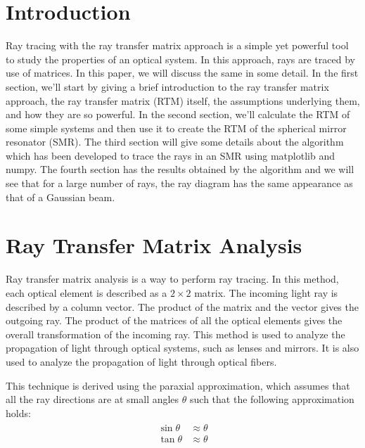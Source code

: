 \documentclass[12pt]{article}
\begin{document}
\section*{Introduction}
Ray tracing with the ray transfer matrix approach is a simple yet powerful tool to study the properties of an optical system. In this approach, rays are traced by use of matrices. In this paper, we will discuss the same in some detail. In the first section, we'll start by giving a brief introduction to the ray transfer matrix approach, the ray transfer matrix (RTM) itself, the assumptions underlying them, and how they are so powerful. In the second section, we'll calculate the RTM of some simple systems and then use it to create the RTM of the spherical mirror resonator (SMR). The third section will give some details about the algorithm which has been developed to trace the rays in an SMR using {\color{cyan}matplotlib} and {\color{cyan}numpy}. The fourth section has the results obtained by the algorithm and we will see that for a large number of rays, the ray diagram has the same appearance as that of a Gaussian beam.

\section{Ray Transfer Matrix Analysis}
Ray transfer matrix analysis is a way to perform ray tracing. In this method, each optical element is described as a \(2\times 2\) matrix. The incoming light ray is described by a column vector. The product of the matrix and the vector gives the outgoing ray. The product of the matrices of all the optical elements gives the overall transformation of the incoming ray. This method is used to analyze the propagation of light through optical systems, such as lenses and mirrors. It is also used to analyze the propagation of light through optical fibers.\cite{wikipedia}\cite{photonics}

This technique is derived using the paraxial approximation, which assumes that all the ray directions are at small angles \(\theta\) such that the following approximation holds:
\begin{align}
    \label{eq:paraxial}
    \begin{split}
        \sin \theta &\approx \theta \\
        \tan \theta &\approx \theta
    \end{split}
\end{align}
\end{document}
